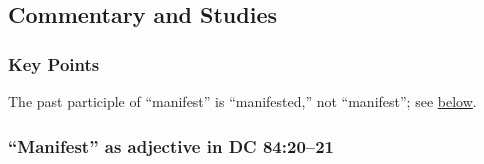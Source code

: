 

	
	
	
	
\subsection{Commentary and Studies} %
	\label{MANIFEST-COMMENTARY}

	\subsubsection{Key Points}
		\label{MANIFEST-KEYS}
	
		\begin{compactitem}
			\item The past participle of ``manifest'' is ``manifested,'' not ``manifest''; see \hyperref[MANIFEST-DC84]{below}.
		\end{compactitem}
		
	\subsubsection{``Manifest'' as adjective in DC 84:20--21}
		\label{MANIFEST-DC84}